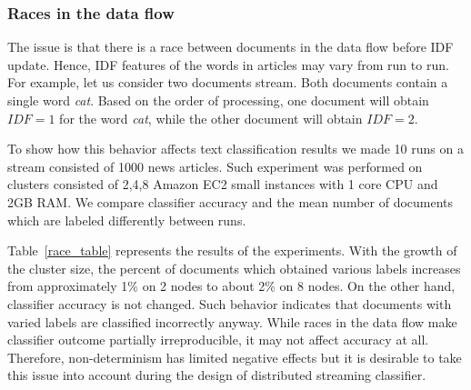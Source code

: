 \subsubsection{Races in the data flow}
The issue is that there is a race between documents in the data flow before IDF update. Hence, IDF features of the words in articles may vary from run to run. For example, let us consider two documents stream. Both documents contain a single word {\em cat}. Based on the order of processing, one document will obtain $IDF=1$ for the word {\em cat}, while the other document will obtain $IDF=2$.

To show how this behavior affects text classification results we made 10 runs on a stream consisted of 1000 news articles. Such experiment was performed on clusters consisted of 2,4,8 Amazon EC2 small instances with 1 core CPU and 2GB RAM. We compare classifier accuracy and the mean number of documents which are labeled differently between runs.


Table~\ref{race_table} represents the results of the experiments. With the growth of the cluster size, the percent of documents which obtained various labels increases from approximately 1\% on 2 nodes to about 2\% on 8 nodes. On the other hand, classifier accuracy is not changed. Such behavior indicates that documents with varied labels are classified incorrectly anyway. While races in the data flow make classifier outcome partially irreproducible, it may not affect accuracy at all. Therefore, non-determinism has limited negative effects but it is desirable to take this issue into account during the design of distributed streaming classifier.   


